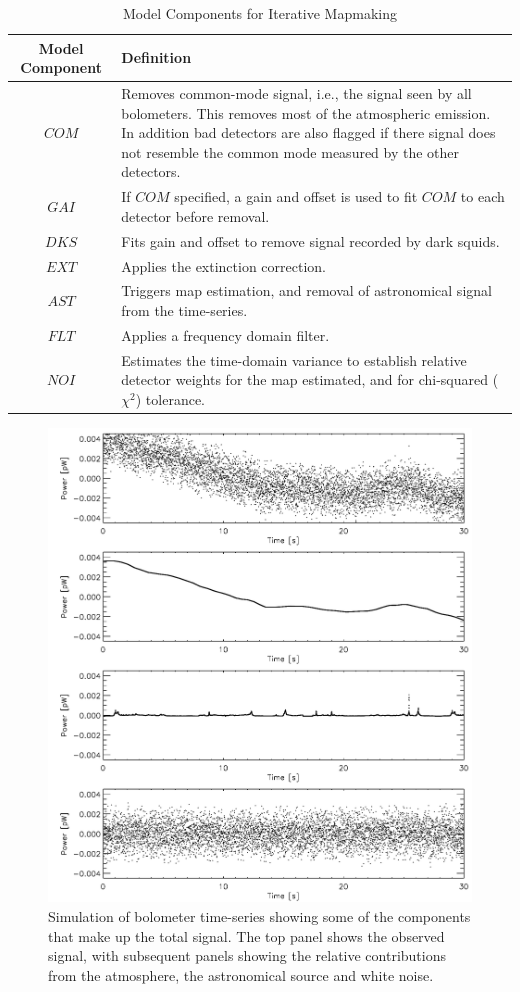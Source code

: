 \documentclass[twoside,11pt]{article}
\renewcommand{\_}{\texttt{\symbol{95}}}
\begin{document}
\begin{table}
\begin{tabular}{cp{10cm}}
 Model Component & Definition \\
\hline
$COM$ & Removes common-mode signal, i.e., the signal seen by all bolometers. This removes most of the atmospheric emission. In addition bad detectors are also flagged if there signal does not resemble the common mode measured by the other detectors. \\
$GAI$ & If $COM$ specified, a gain and offset is used to fit $COM$ to each detector before removal. \\
$DKS$ & Fits gain and offset to remove signal recorded by dark squids. \\
$EXT$ & Applies the extinction correction. \\
$AST$ & Triggers map estimation, and removal of astronomical signal from the time-series. \\
$FLT$ & Applies a frequency domain filter. \\
$NOI$ & Estimates the time-domain variance to establish relative detector weights for the map estimated, and for chi-squared ($\chi^2$) tolerance. \\
\hline
\end{tabular}
\caption{Model Components for Iterative Mapmaking}
\label{tab:dimm_components}
\end{table}

\begin{figure}[htb]
  \begin{center}
    \includegraphics[width=0.76\linewidth]{sun258_signalcpts}
    \caption{Simulation of bolometer time-series showing some of the
      components that make up the total signal. The top panel shows
      the observed signal, with subsequent panels showing the relative
      contributions from the atmosphere, the astronomical source and
      white noise.}
    \label{fig:comps}
  \end{center}
\end{figure}
\end{document}
